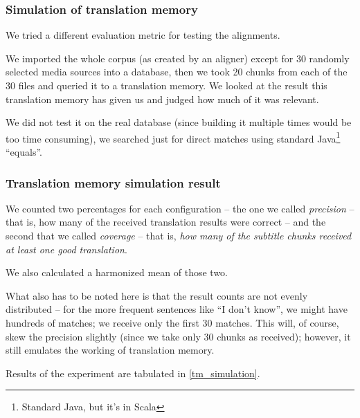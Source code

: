 \subsubsection{Simulation of translation memory}
We tried a different evaluation metric for testing the alignments.

We imported the whole corpus (as created by an aligner) except for 30 randomly selected media sources into a database, then we took 20 chunks from each of the 30 files and queried it to a translation memory. We looked at the result this translation memory has given us and judged how much of it was relevant.

We did not test it on the real database (since building it multiple times would be too time consuming), we searched just for direct matches using standard Java\footnote{Standard Java, but it's in Scala} ``equals''.

\subsubsection{Translation memory simulation result}

We counted two percentages for each configuration -- the one we called \emph{precision} -- that is, how many of the received translation results were correct -- and the second that we called \emph{coverage} -- that is, \emph{how many of the subtitle chunks received at least one good translation}.

We also calculated a harmonized mean of those two.

What also has to be noted here is that the result counts are not evenly distributed -- for the more frequent sentences like ``I don't know'', we might have hundreds of matches; we receive only the first 30 matches. This will, of course, skew the precision slightly (since we take only 30 chunks as received); however, it still emulates the working of translation memory.

Results of the experiment are tabulated in \ref{tm_simulation}.

